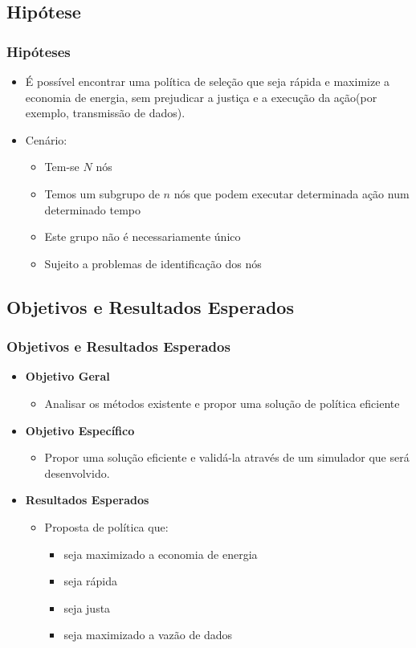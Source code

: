 \documentclass{beamer}
\begin{document}
\subsection{Hipótese}
\begin{frame}
    \frametitle{Hipóteses}
    \begin{itemize}
      \item É possível encontrar uma política de seleção que seja rápida e
      maximize a economia de energia, sem prejudicar a justiça e a execução da
      ação(por exemplo, transmissão de dados).
      \item Cenário:
        \begin{itemize}
            \item Tem-se $N$ nós
            \item Temos um subgrupo de $n$ nós que podem executar determinada
            ação num determinado tempo
            \item Este grupo não é necessariamente único
            \item Sujeito a problemas de identificação dos nós
        \end{itemize} 
    \end{itemize}
\end{frame}


\subsection{Objetivos e Resultados Esperados}
\begin{frame}
    \frametitle{Objetivos e Resultados Esperados}
    \begin{itemize}
      \item \textbf{Objetivo Geral}
        \begin{itemize}
          \item Analisar os métodos existente e propor uma solução de política
          eficiente
        \end{itemize}
      \item \textbf{Objetivo Específico}
        \begin{itemize}
          \item Propor uma solução eficiente e validá-la através de um simulador
          que será desenvolvido.
        \end{itemize}
      \item \textbf{Resultados Esperados}
        \begin{itemize}
          \item Proposta de política que:
            \begin{itemize}
              \item seja maximizado a economia de energia
              \item seja rápida
              \item seja justa
              \item seja maximizado a vazão de dados
            \end{itemize}
        \end{itemize}
    \end{itemize}
\end{frame}
\end{document}
